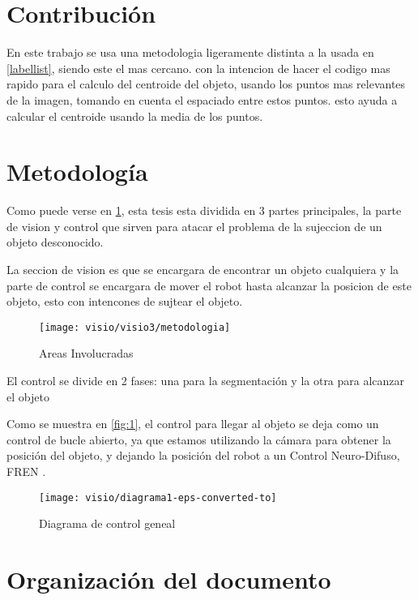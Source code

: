 \section{Contribución}
En este trabajo se usa una metodologia ligeramente distinta a la usada en \cref{labellist},  siendo este el mas cercano.
con la intencion de hacer el codigo mas rapido para el calculo del centroide del objeto, usando los puntos mas relevantes de la imagen, tomando en cuenta el espaciado entre estos puntos.
esto ayuda a calcular el centroide usando la media de los puntos.

\section{Metodología}

Como puede verse en \cref{fig:metodologia}, esta tesis esta dividida en 3 partes principales, la parte de vision y control que sirven para atacar el problema de la sujeccion de un objeto desconocido.

La seccion de vision es que se encargara de encontrar un objeto cualquiera y la parte de control se encargara de mover el robot hasta alcanzar la posicion de este objeto, esto con intencones de sujtear el objeto.

\begin{figure}[h]
	\centering
	\texttt{[image: visio/visio3/metodologia]}
	\caption{Areas Involucradas}
	\label{fig:metodologia}
\end{figure}

El control se divide en 2 fases: una para la segmentación y la otra para alcanzar el objeto

Como se muestra en \cref{fig:1}, el control para llegar al objeto se deja como un control de bucle abierto, ya que estamos utilizando la cámara para obtener la posición del objeto, y dejando la posición del robot a un Control Neuro-Difuso, FREN \cite{fren}.

\begin{figure}[h]
	\centering
	\texttt{[image: visio/diagrama1-eps-converted-to]}
	\caption{Diagrama de control geneal}
	\label{fig:diagrama1-eps-converted-to}
\end{figure}

\section{Organización del documento}


